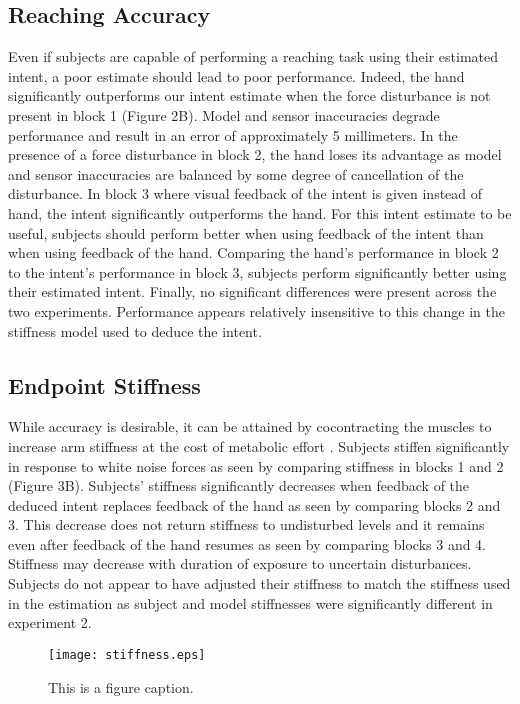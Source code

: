 \documentclass[letterpaper, 10 pt, conference]{ieeeconf}  %
\begin{document}
\subsection*{Reaching Accuracy}
Even if subjects are capable of performing a reaching task using their estimated intent, a poor estimate should lead to poor performance. Indeed, the hand significantly outperforms our intent estimate when the force disturbance is not present in block 1 (Figure 2B). Model and sensor inaccuracies degrade performance and result in an error of approximately 5 millimeters. In the presence of a force disturbance in block 2, the hand loses its advantage as model and sensor inaccuracies are balanced by some degree of cancellation of the disturbance. In block 3 where visual feedback of the intent is given instead of hand, the intent significantly outperforms the hand. For this intent estimate to be useful, subjects should perform better when using feedback of the intent than when using feedback of the hand. Comparing the hand's performance in block 2 to the intent's performance in block 3, subjects perform significantly better using their estimated intent. Finally, no significant differences were present across the two experiments. Performance appears relatively insensitive to this change in the stiffness model used to deduce the intent.

\subsection*{Endpoint Stiffness}
While accuracy is desirable, it can be attained by cocontracting the muscles to increase arm stiffness at the cost of metabolic effort \cite{gribble2003role}\cite{takahashi2001impedance}. Subjects stiffen significantly in response to white noise forces as seen by comparing stiffness in blocks 1 and 2 (Figure 3B). Subjects' stiffness significantly decreases when feedback of the deduced intent replaces feedback of the hand as seen by comparing blocks 2 and 3. This decrease does not return stiffness to undisturbed levels and it remains even after feedback of the hand resumes as seen by comparing blocks 3 and 4. Stiffness may decrease with duration of exposure to uncertain disturbances\cite{takahashi2001impedance}. Subjects do not appear to have adjusted their stiffness to match the stiffness used in the estimation as subject and model stiffnesses were significantly different in experiment 2.

\begin{figure}[h]
	\centering
	\texttt{[image: stiffness.eps]}      
	\caption{This is a figure caption.}
	\label{stiffness}
\end{figure}
\end{document}
